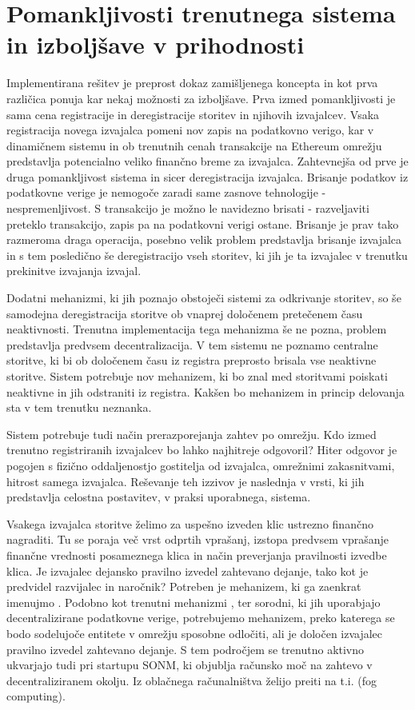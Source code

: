 \documentclass[a4paper, 12pt]{book}
\begin{document}
\section{Pomankljivosti trenutnega sistema in izboljšave v prihodnosti}

Implementirana rešitev je preprost dokaz zamišljenega koncepta in kot prva različica ponuja kar nekaj možnosti za izboljšave.
Prva izmed pomankljivosti je sama cena registracije in deregistracije storitev in njihovih izvajalcev.
Vsaka registracija novega izvajalca pomeni nov zapis na podatkovno verigo, kar v dinamičnem sistemu in ob trenutnih cenah transakcije na Ethereum omrežju predstavlja potencialno veliko finančno breme za izvajalca.
Zahtevnejša od prve je druga pomankljivost sistema in sicer deregistracija izvajalca.
Brisanje podatkov iz podatkovne verige je nemogoče zaradi same zasnove tehnologije - nespremenljivost.
S transakcijo je možno le navidezno brisati - razveljaviti preteklo transakcijo, zapis pa na podatkovni verigi ostane.
Brisanje je prav tako razmeroma draga operacija, posebno velik problem predstavlja brisanje izvajalca in s tem posledično še deregistracijo vseh storitev, ki jih je ta izvajalec v trenutku prekinitve izvajanja izvajal.

Dodatni mehanizmi, ki jih poznajo obstoječi sistemi za odkrivanje storitev, so še samodejna deregistracija storitve ob vnaprej določenem pretečenem času neaktivnosti.
Trenutna implementacija tega mehanizma še ne pozna, problem predstavlja predvsem decentralizacija.
V tem sistemu ne poznamo centralne storitve, ki bi ob določenem času iz registra preprosto brisala vse neaktivne storitve.
Sistem potrebuje nov mehanizem, ki bo znal med storitvami poiskati neaktivne in jih odstraniti iz registra. Kakšen bo mehanizem in princip delovanja sta v tem trenutku neznanka.

Sistem potrebuje tudi način prerazporejanja zahtev po omrežju.
Kdo izmed trenutno registriranih izvajalcev bo lahko najhitreje odgovoril?
Hiter odgovor je pogojen s fizično oddaljenostjo gostitelja od izvajalca, omrežnimi zakasnitvami, hitrost samega izvajalca. Reševanje teh izzivov je naslednja v vrsti, ki jih predstavlja celostna postavitev, v praksi uporabnega, sistema.


Vsakega izvajalca storitve želimo za uspešno izveden klic ustrezno finančno nagraditi. Tu se poraja več vrst odprtih vprašanj, izstopa predvsem vprašanje finančne vrednosti posameznega klica in način preverjanja pravilnosti izvedbe klica.
Je izvajalec dejansko pravilno izvedel zahtevano dejanje, tako kot je predvidel razvijalec in naročnik?
Potreben je mehanizem, ki ga zaenkrat imenujmo .
Podobno kot trenutni mehanizmi ,  ter sorodni, ki jih uporabjajo decentralizirane podatkovne verige, potrebujemo mehanizem, preko katerega se bodo sodelujoče entitete v omrežju sposobne odločiti, ali je določen izvajalec pravilno izvedel zahtevano dejanje.
S tem področjem se trenutno aktivno ukvarjajo tudi pri startupu SONM, ki objublja računsko moč na zahtevo v decentraliziranem okolju. Iz oblačnega računalništva želijo preiti na t.i.  (fog computing). \cite{Sonm}
\end{document}
